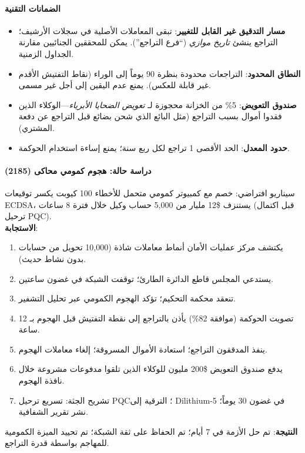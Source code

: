 \documentclass[11pt]{article}
\begin{document}
\paragraph{الضمانات التقنية}
\begin{itemize}[noitemsep]
  \item \textbf{مسار التدقيق غير القابل للتغيير}: تبقى المعاملات الأصلية في سجلات الأرشيف؛ التراجع ينشئ \emph{تاريخ موازي} (``فرع التراجع''). يمكن للمحققين الجنائيين مقارنة الجداول الزمنية.
  \item \textbf{النطاق المحدود}: التراجعات محدودة بنظرة 90 يوماً إلى الوراء (نقاط التفتيش الأقدم غير قابلة للعكس). يمنع عدم اليقين إلى أجل غير مسمى.
  \item \textbf{صندوق التعويض}: 5\% من الخزانة محجوزة لـ \emph{تعويض الضحايا الأبرياء}—الوكلاء الذين فقدوا أموال بسبب التراجع (مثل البائع الذي شحن بضائع قبل التراجع عن دفعة المشتري).
  \item \textbf{حدود المعدل}: الحد الأقصى 1 تراجع لكل ربع سنة؛ يمنع إساءة استخدام الحوكمة.
\end{itemize}

\paragraph{دراسة حالة: هجوم كمومي محاكى (2185)}
سيناريو افتراضي: خصم مع كمبيوتر كمومي متحمل للأخطاء 100 كيوبت يكسر توقيعات ECDSA، يستنزف \$12 مليار من 5,000 حساب وكيل خلال فترة 8 ساعات (قبل اكتمال ترحيل PQC).\\
\textbf{الاستجابة}:
\begin{enumerate}[noitemsep]
  \item يكتشف مركز عمليات الأمان أنماط معاملات شاذة (10,000 تحويل من حسابات بدون نشاط حديث).
  \item يستدعي المجلس قاطع الدائرة الطارئ؛ توقفت الشبكة في غضون ساعتين.
  \item تنعقد محكمة التحكيم؛ تؤكد الهجوم الكمومي عبر تحليل التشفير.
  \item تصويت الحوكمة (موافقة 82\%) يأذن بالتراجع إلى نقطة التفتيش قبل الهجوم بـ 12 ساعة.
  \item ينفذ المدققون التراجع؛ استعادة الأموال المسروقة؛ إلغاء معاملات الهجوم.
  \item يدفع صندوق التعويض \$200 مليون للوكلاء الذين تلقوا مدفوعات مشروعة خلال نافذة الهجوم.
  \item تشريح الجثة: تسريع ترحيل PQC؛ الترقية إلى Dilithium-5 في غضون 30 يوماً؛ نشر تقرير الشفافية.
\end{enumerate}
\textbf{النتيجة}: تم حل الأزمة في 7 أيام؛ تم الحفاظ على ثقة الشبكة؛ تم تحييد الميزة الكمومية للمهاجم بواسطة قدرة التراجع.
\end{document}
